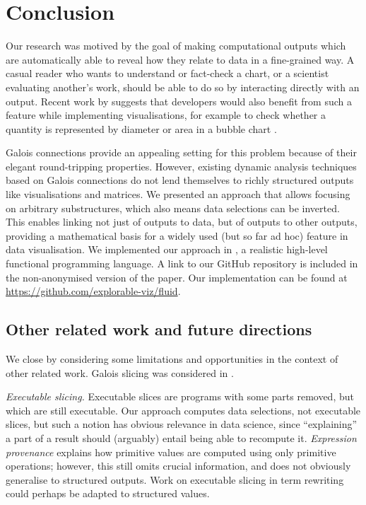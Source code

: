 \section{Conclusion}
\label{sec:conclusion}

Our research was motived by the goal of making computational outputs which are automatically able to reveal how they relate to data in a fine-grained way. A casual reader who wants to understand or fact-check a chart, or a scientist evaluating another's work, should be able to do so by interacting directly with an output. Recent work by \citeauthor{walny19} suggests that developers would also benefit from such a feature while implementing visualisations, for example to check whether a quantity is represented by diameter or area in a bubble chart \cite{walny19}.

Galois connections provide an appealing setting for this problem because of their elegant round-tripping properties. However,  existing dynamic analysis techniques based on Galois connections do not lend themselves to richly structured outputs like visualisations and matrices. We presented an approach that allows focusing on arbitrary substructures, which also means data selections can be inverted. This enables linking not just of outputs to data, but of outputs to other outputs, providing a mathematical basis for a widely used (but so far ad hoc) feature in data visualisation. We implemented our approach in \OurLanguage, a realistic high-level functional programming language. %
\ifanonymous%
   A link to our GitHub repository is included in the non-anonymised version of the paper.
\else%
   Our implementation can be found at \url{https://github.com/explorable-viz/fluid}.%
\fi%

\subsection{Other related work and future directions}
\label{sec:conclusion:other-related-work}

We close by considering some limitations and opportunities in the context of other related work. Galois slicing \cite{perera12a,ricciotti17,perera16d} was considered in .

\emph{Executable slicing.} Executable slices \cite{hall95} are programs with some parts removed, but which are still executable. Our approach computes data selections, not executable slices, but such a notion has obvious relevance in data science, since ``explaining'' a part of a result should (arguably) entail being able to recompute it. \emph{Expression provenance} \cite{acar12} explains how primitive values are computed using only primitive operations; however, this still omits crucial information, and does not obviously generalise to structured outputs. Work on executable slicing in term rewriting \cite{field98} could perhaps be adapted to structured values.

